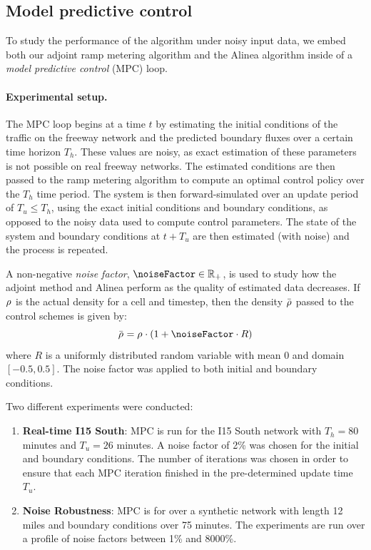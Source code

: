 																
								\subsection{Model predictive control\label{sub:Model-predictive-control}}
																
								To study the performance of the algorithm under noisy input data,
								we embed both our adjoint ramp metering algorithm and the Alinea algorithm
								inside of a \emph{model predictive control }(MPC) loop.
																
																
								\paragraph{Experimental setup.}
																
								The MPC loop begins at a time $t$ by estimating the initial conditions
								of the traffic on the freeway network and the predicted boundary fluxes
								over a certain time horizon $T_{h}$. These values are noisy, as exact
								estimation of these parameters is not possible on real freeway networks.
								The estimated conditions are then passed to the ramp metering algorithm
								to compute an optimal control policy over the $T_{h}$ time period.
								The system is then forward-simulated over an update period of $T_{u}\le T_{h}$,
								using the exact initial conditions and boundary conditions, as opposed
								to the noisy data used to compute control parameters. The state of
								the system and boundary conditions at $t+T_{u}$ are then estimated
								(with noise) and the process is repeated.
																
								A non-negative\emph{ noise factor}, $\noiseFactor \in \R_+$, is used to study how the adjoint
								method and Alinea perform as the quality of estimated data decreases. If $\rho_{}^{}$ is the actual density for a cell and timestep, then the density $\bar{\rho_{}^{}}$ passed to the control schemes is given by:
								\[
								\bar{\discrete{}{}}=\discrete{}{}\cdot \left(1+\noiseFactor\cdot R\right)
								\]
								where $R$ is a uniformly distributed random variable with mean $0$
								and domain $\left[-0.5,0.5\right]$. The noise factor was applied
								to both initial and boundary conditions.
																
								Two different experiments were conducted:
								\begin{enumerate}
									\item \textbf{Real-time I15 South}: MPC is run for the I15 South network
									with $T_{h}=80$ minutes and $T_{u}=26$ minutes. A noise factor of
									2\% was chosen for the initial and boundary conditions. The number
									of iterations was chosen in order to ensure that each MPC iteration
									finished in the pre-determined update time $T_{u}$.
									\item \textbf{Noise Robustness}: MPC is for over a synthetic network with
									length 12 miles and boundary conditions over 75 minutes. The experiments
									are run over a profile of noise factors between 1\% and 8000\%.
								\end{enumerate}
																
